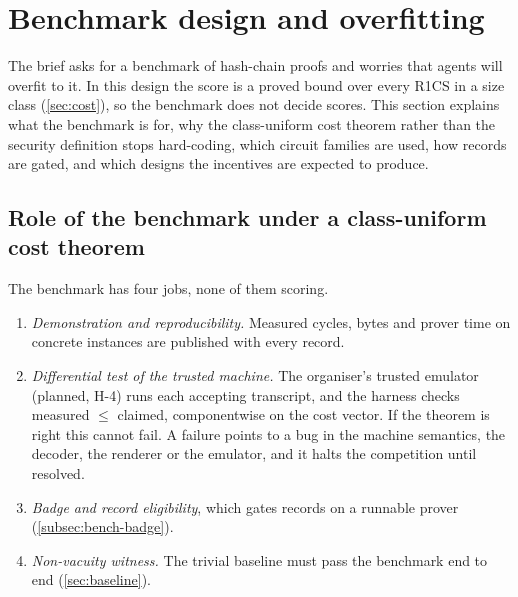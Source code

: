 \section{Benchmark design and overfitting}\label{sec:benchmark}

The brief asks for a benchmark of hash-chain proofs and worries that agents will overfit to it. In
this design the score is a proved bound over every R1CS in a size class (\cref{sec:cost}), so the
benchmark does not decide scores. This section explains what the benchmark is for, why the
class-uniform cost theorem rather than the security definition stops hard-coding, which circuit families are used, how
records are gated, and which designs the incentives are expected to produce.

\subsection{Role of the benchmark under a class-uniform cost theorem}\label{subsec:bench-role}

The benchmark has four jobs, none of them scoring.
\begin{enumerate}[nosep,label=(\roman*)]
\item \emph{Demonstration and reproducibility.} Measured cycles, bytes and prover time on concrete
  instances are published with every record.
\item \emph{Differential test of the trusted machine.} The organiser's trusted emulator (planned,
  H-4) runs each accepting transcript, and the harness checks measured $\le$ claimed, componentwise on the cost vector. If the
  theorem is right this cannot fail. A failure points to a bug in the machine semantics, the decoder,
  the renderer or the emulator, and it halts the competition until resolved.
\item \emph{Badge and record eligibility}, which gates records on a runnable prover
  (\cref{subsec:bench-badge}).
\item \emph{Non-vacuity witness.} The trivial baseline must pass the benchmark end to end
  (\cref{sec:baseline}).
\end{enumerate}

